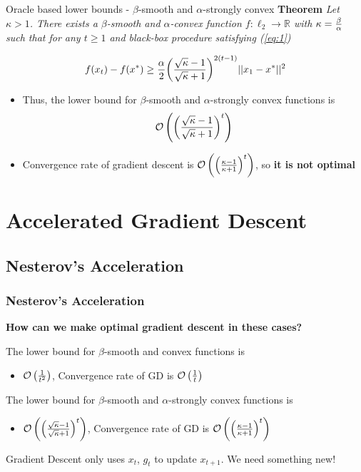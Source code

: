 \begin{frame}{Oracle based lower bounds - $\beta$-smooth and $\alpha$-strongly convex}
    \textbf{Theorem} {\it Let $\kappa > 1$. There exists a $\beta$-smooth and $\alpha$-convex function $f:{\ell}_2\rightarrow \mathds{R}$ with $\kappa={\beta \over \alpha}$ such that for any ${t \geq 1}$ and black-box procedure satisfying (\ref{eq:1})}

    $$f(x_t) - f(x^*) \geq {\alpha \over 2}{\left({\sqrt{\kappa}-1 \over \sqrt{\kappa}+1}\right)}^{2(t-1)}||x_1-x^*||^2$$

    \begin{itemize}
        \item Thus, the lower bound for $\beta$-smooth and $\alpha$-strongly convex functions is $$\mathcal{O}\left(\left({\sqrt{\kappa}-1 \over \sqrt{\kappa}+1}\right)^t\right)$$ 
        \item  Convergence rate of gradient descent is $ \mathcal{O}\left(\left({\kappa-1 \over \kappa+1}\right)^t\right)$, so \textbf{it is not optimal}
    \end{itemize}
    
\end{frame}

\section{Accelerated Gradient Descent}

\subsection{Nesterov’s Acceleration}

\begin{frame}\frametitle{ Nesterov’s Acceleration}

\textbf{How can we make optimal gradient descent in these cases?}

The lower bound for $\beta$-smooth and convex functions is 
\begin{itemize}
    \item $\mathcal{O}\left({1 \over {t}^2}\right) $, Convergence rate of GD is $\mathcal{O}\left({1 \over t}\right) $
\end{itemize}

The lower bound for $\beta$-smooth and $\alpha$-strongly convex functions is 
\begin{itemize}
    \item $\mathcal{O}\left(\left({\sqrt{\kappa}-1 \over \sqrt{\kappa}+1}\right)^t\right)$, Convergence rate of GD is $ \mathcal{O}\left(\left({\kappa-1 \over \kappa+1}\right)^t\right)$
\end{itemize}

Gradient Descent only uses $x_t$, $g_t$ to update $x_{t+1}$. We need something new!

\end{frame}


